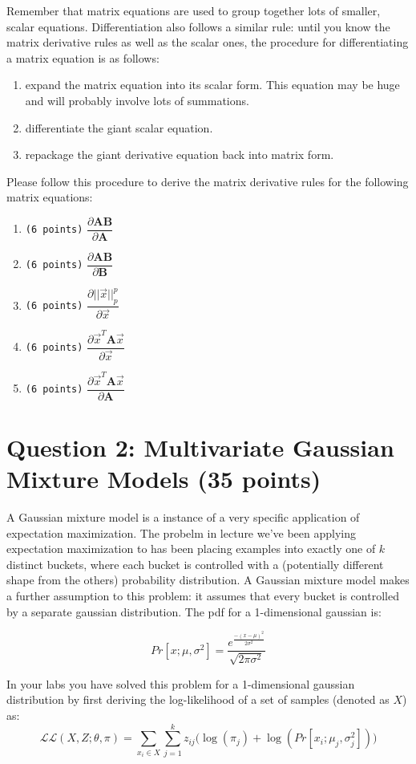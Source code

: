 \documentclass[11pt]{article}
\newcommand{\question}[1]{\section*{\normalsize #1}}
\begin{document}
\noindent Remember that matrix equations are used to group together lots of smaller, scalar equations. Differentiation also follows a similar rule: until you know the matrix derivative rules as well as the scalar ones, the procedure for differentiating a matrix equation is as follows:
\begin{enumerate}
    \item expand the matrix equation into its scalar form. This equation may be huge and will probably involve lots of summations.
    \item differentiate the giant scalar equation.
    \item repackage the giant derivative equation back into matrix form.
\end{enumerate}
Please follow this procedure to derive the matrix derivative rules for the following matrix equations:
\begin{enumerate}
    \item \texttt{(6 points)} $\dfrac{\partial \textbf{AB}}{\partial \textbf{A}}$
    \item \texttt{(6 points)} $\dfrac{\partial \textbf{AB}}{\partial \textbf{B}}$
    \item \texttt{(6 points)} $\dfrac{\partial ||\vec{x}||_p^p}{\partial \vec{x}}$
    \item \texttt{(6 points)} $\dfrac{\partial \vec{x}^T \textbf{A}\vec{x}}{\partial \vec{x}}$
    \item \texttt{(6 points)} $\dfrac{\partial \vec{x}^T\textbf{A}\vec{x}}{\partial \textbf{A}}$
\end{enumerate}\newpage








\question{Question 2: Multivariate Gaussian Mixture Models (35 points)}
A Gaussian mixture model is a instance of a very specific application of expectation maximization. The probelm in lecture we've been applying expectation maximization to has been placing examples into exactly one of $k$ distinct buckets, where each bucket is controlled with a (potentially different shape from the others) probability distribution. A Gaussian mixture model makes a further assumption to this problem: it assumes that every bucket is controlled by a separate gaussian distribution. The pdf for a 1-dimensional gaussian is:

$$Pr[x ; \mu, \sigma^2] = \frac{e^{\frac{-(x-\mu)^2}{2\sigma^2}}}{\sqrt{2\pi \sigma^2}}$$

\noindent In your labs you have solved this problem for a 1-dimensional gaussian distribution by first deriving the log-likelihood of a set of samples (denoted as $X$) as:
$$\mathcal{LL}(X,Z;\theta, \pi) = \sum\limits_{x_i\in X} \sum\limits_{j=1}^k z_{ij}\Big(\log(\pi_j) + \log(Pr[x_i;\mu_j,\sigma^2_j])\Big)$$
\end{document}
